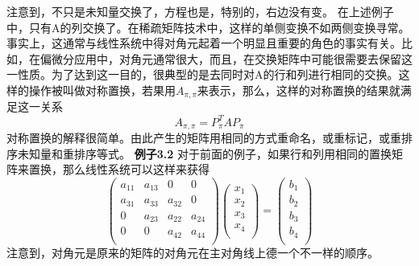 \documentclass{article}
\begin{document}
注意到，不只是未知量交换了，方程也是，特别的，右边没有变。
\newline
在上述例子中，只有A的列交换了。在稀疏矩阵技术中，这样的单侧变换不如两侧变换寻常。事实上，这通常与线性系统中得对角元起着一个明显且重要的角色的事实有关。比如，在偏微分应用中，对角元通常很大，而且，在交换矩阵中可能很需要去保留这一性质。为了达到这一目的，很典型的是去同时对A的行和列进行相同的交换。这样的操作被叫做对称置换，若果用$A_{\pi,\pi}$来表示，那么，这样的对称置换的结果就满足这一关系
$$A_{\pi,\pi}=P_{\pi}^TAP_{\pi}$$
对称置换的解释很简单。由此产生的矩阵用相同的方式重命名，或重标记，或重排序未知量和重排序等式。
\newline
\textbf{例子3.2}
对于前面的例子，如果行和列用相同的置换矩阵来置换，那么线性系统可以这样来获得
$$
\left (                 
\begin{array}{cccc}   
    a_{11} & a_{13}& 0 & 0\\  
     a_{31} & a_{33}& a_{32}  & 0 \\ 
    0 & a_{23}& a_{22}  & a_{24} \\ 
    0  & 0& a_{42} & a_{44} \\ 
\end{array}
\right)          
\left (                 
\begin{array}{c}   
    x_{1} \\  
    x_{2} \\  
    x_{3} \\  
    x_{4} \\  
\end{array}
\right)           
=
\left (                 
\begin{array}{c}   
    b_{1} \\  
    b_{2} \\  
    b_{3} \\  
    b_{4} \\  
\end{array}
\right)   
$$
注意到，对角元是原来的矩阵的对角元在主对角线上德一个不一样的顺序。
\newline
\end{document}
